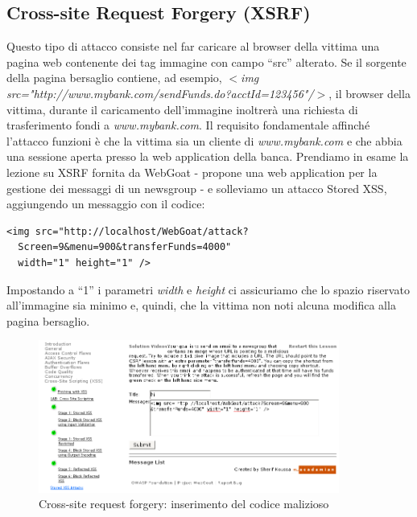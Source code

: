 \documentclass[a4paper,openright,italian]{article}
\begin{document}
\subsection{Cross-site Request Forgery (XSRF) \cite{XSRF}}
Questo tipo di attacco consiste nel far caricare al browser della vittima una pagina web contenente dei tag immagine con campo ``src'' alterato. Se il sorgente della pagina bersaglio contiene, ad esempio, {\it $<$img src="http://www.mybank.com/sendFunds.do?acctId=123456"/$>$}, il browser della vittima, durante il caricamento dell'immagine inoltrer\`a una richiesta di trasferimento fondi a {\it www.mybank.com}. Il requisito fondamentale affinch\'e l'attacco funzioni \`e che la vittima sia un cliente di {\it www.mybank.com} e che abbia una sessione aperta presso la web application della banca.
Prendiamo in esame la lezione su XSRF fornita da WebGoat - propone una web application per la gestione dei messaggi di un newsgroup - e solleviamo un attacco Stored XSS, aggiungendo un messaggio con il codice:
\begin{lstlisting}[caption={tag ``img'' da aggiungere al messaggio}, label={code:xsrfx},frame=trBL]
 <img src="http://localhost/WebGoat/attack?
  Screen=9&menu=900&transferFunds=4000"
  width="1" height="1" />
\end{lstlisting}
Impostando a ``1'' i parametri {\it width} e {\it height} ci assicuriamo che lo spazio riservato all'immagine sia minimo e, quindi, che la vittima non noti alcuna modifica alla pagina bersaglio.
\begin{figure}[h]
\centering
\includegraphics[width=280pt]{images/xss_xsrf_1.png}
\caption{Cross-site request forgery: inserimento del codice malizioso}
\end{figure}
\end{document}
